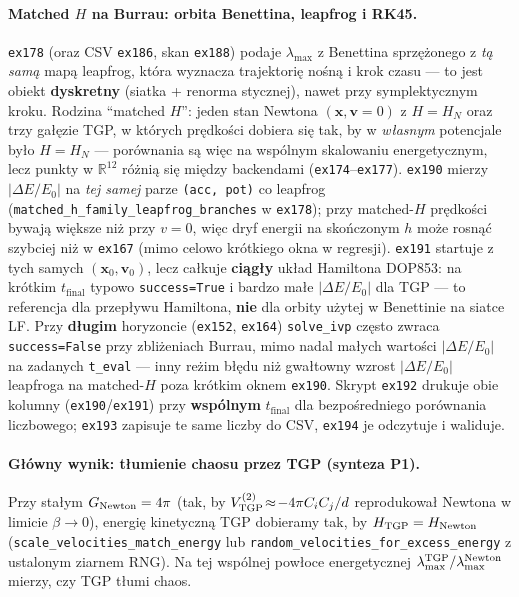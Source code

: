 \paragraph{Matched $H$ na Burrau: orbita Benettina, leapfrog i RK45.}
\texttt{ex178} (oraz CSV \texttt{ex186}, skan \texttt{ex188}) podaje
$\lambda_{\max}$ z Benettina sprzężonego z \emph{tą samą} mapą leapfrog, która
wyznacza trajektorię nośną i krok czasu --- to jest obiekt \textbf{dyskretny}
(siatka + renorma stycznej), nawet przy symplektycznym kroku.
Rodzina ``matched $H$'': jeden stan Newtona $(\mathbf x,\mathbf v{=}0)$ z
$H{=}H_N$ oraz trzy gałęzie TGP, w których prędkości dobiera się tak, by w
\emph{własnym} potencjale było $H{=}H_N$ --- porównania są więc na wspólnym
skalowaniu energetycznym, lecz punkty w $\mathbb R^{12}$ różnią się między
backendami (\texttt{ex174}--\texttt{ex177}).
\texttt{ex190} mierzy $|{\Delta E}/{E_0}|$ na \emph{tej samej} parze
\texttt{(acc, pot)} co leapfrog (\texttt{matched\_h\_family\_leapfrog\_branches}
w \texttt{ex178}); przy matched-$H$ prędkości bywają większe niż przy $v{=}0$,
więc dryf energii na skończonym $h$ może rosnąć szybciej niż w \texttt{ex167}
(mimo celowo krótkiego okna w regresji).
\texttt{ex191} startuje z tych samych $(\mathbf x_0,\mathbf v_0)$, lecz całkuje
\textbf{ciągły} układ Hamiltona DOP853: na krótkim $t_{\mathrm{final}}$ typowo
\texttt{success=True} i bardzo małe $|{\Delta E}/{E_0}|$ dla TGP --- to referencja
dla przepływu Hamiltona, \textbf{nie} dla orbity użytej w Benettinie na siatce LF.
Przy \textbf{długim} horyzoncie (\texttt{ex152}, \texttt{ex164}) \texttt{solve\_ivp}
często zwraca \texttt{success=False} przy zbliżeniach Burrau, mimo nadal małych
wartości $|{\Delta E}/{E_0}|$ na zadanych \texttt{t\_eval} --- inny reżim błędu
niż gwałtowny wzrost $|{\Delta E}/{E_0}|$ leapfroga na matched-$H$ poza krótkim
oknem \texttt{ex190}.
Skrypt \texttt{ex192} drukuje obie kolumny (\texttt{ex190}/\texttt{ex191}) przy
\textbf{wspólnym} $t_{\mathrm{final}}$ dla bezpośredniego porównania liczbowego;
\texttt{ex193} zapisuje te same liczby do CSV, \texttt{ex194} je odczytuje i waliduje.

\paragraph{Główny wynik: tłumienie chaosu przez TGP (synteza P1).}
Przy stałym $G_{\rm Newton}=4\pi$ (tak, by $V_{\rm TGP}^{(2)}\!\approx\! -4\pi C_i C_j/d$
reprodukował Newtona w limicie $\beta\to0$), energię kinetyczną TGP dobieramy
tak, by $H_{\rm TGP}=H_{\rm Newton}$ (\texttt{scale\_velocities\_match\_energy}
lub \texttt{random\_velocities\_for\_excess\_energy} z ustalonym ziarnem RNG).
Na tej wspólnej powłoce energetycznej $\lambda_{\max}^{\rm TGP}/\lambda_{\max}^{\rm Newton}$
mierzy, czy TGP tłumi chaos.

